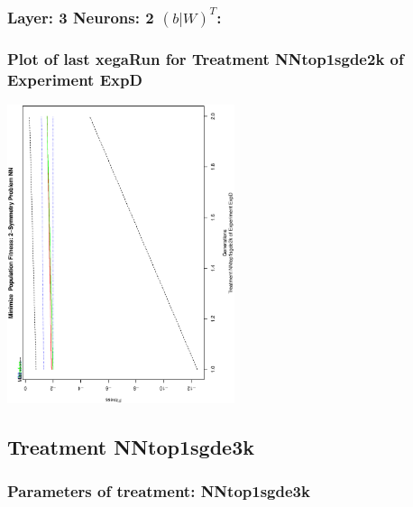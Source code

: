 \documentclass[18pt,c]{beamer}
\makeatletter
\def\beamer@writeslidentry@miniframesoff{%
  \expandafter\beamer@ifempty\expandafter{\beamer@framestartpage}{}%
  {%
   \clearpage\beamer@notesactions%
  }
}
\newcommand*{\miniframesoff}{\let\beamer@writeslidentry=\beamer@writeslidentry@miniframesoff}
\makeatother
\begin{document}

 \begin{frame}
 \fontsize{8pt}{9pt}\selectfont
 \frametitle{ Layer: 3 Neurons: 2  $(b|W)^T$: 
 }

 \label{ExpDNNWeightTable017.tex}  
 \end{frame}

 \begin{frame}
 \frametitle{ Plot of last xegaRun for Treatment NNtop1sgde2k of Experiment ExpD }
 \begin{center}
\includegraphics[width=0.5\textwidth, angle=-90]
{ExpDPlotPopStatsFigure005.eps}
 \end{center}
 \label{report/ExpDPlotPopStatsFigure005.eps}  
 \end{frame}

\miniframesoff
\subsection{Treatment NNtop1sgde3k}

 \begin{frame}
 \fontsize{8pt}{9pt}\selectfont
 \frametitle{  Parameters of treatment: NNtop1sgde3k 
 }

 \label{ExpDtParmTable018.tex}  
 \end{frame}
\end{document}
